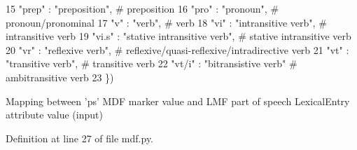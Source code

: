 \begin{DoxyCode}
15     \textcolor{stringliteral}{"prep"}      : \textcolor{stringliteral}{"preposition"},                \textcolor{comment}{# preposition}
16     \textcolor{stringliteral}{"pro"}       : \textcolor{stringliteral}{"pronoun"},                    \textcolor{comment}{# pronoun/pronominal}
17     \textcolor{stringliteral}{"v"}         : \textcolor{stringliteral}{"verb"},                       \textcolor{comment}{# verb}
18     \textcolor{stringliteral}{"vi"}        : \textcolor{stringliteral}{"intransitive verb"},          \textcolor{comment}{# intransitive verb}
19     \textcolor{stringliteral}{"vi.s"}      : \textcolor{stringliteral}{"stative intransitive verb"},  \textcolor{comment}{# stative intransitive verb}
20     \textcolor{stringliteral}{"vr"}        : \textcolor{stringliteral}{"reflexive verb"},             \textcolor{comment}{# reflexive/quasi-reflexive/intradirective verb}
21     \textcolor{stringliteral}{"vt"}        : \textcolor{stringliteral}{"transitive verb"},            \textcolor{comment}{# transitive verb}
22     \textcolor{stringliteral}{"vt/i"}      : \textcolor{stringliteral}{"bitransistive verb"}          \textcolor{comment}{# ambitransitive verb}
23 \})
\end{DoxyCode}


Mapping between 'ps' M\+D\+F marker value and L\+M\+F part of speech Lexical\+Entry attribute value (input) 



Definition at line 27 of file mdf.\+py.

